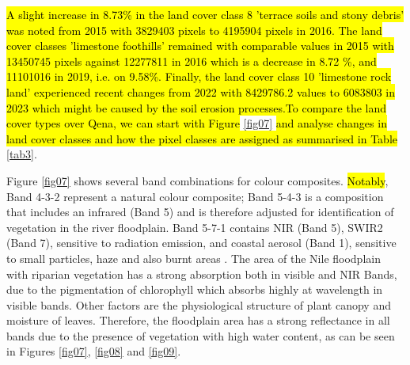 \documentclass[information,article,submit,pdftex,moreauthors]{Definitions/mdpi}
\begin{document}
\hl{A slight increase in 8.73\% in the land cover class 8 'terrace soils and stony debris' was noted from 2015 with 3829403 pixels to 4195904 pixels in 2016. The land cover classes 'limestone foothills' remained with comparable values in 2015 with 13450745 pixels against 12277811 in 2016 which is a decrease in 8.72 \%, and 11101016 in 2019, i.e. on 9.58\%. Finally, the land cover class 10 'limestone rock land' experienced recent changes from 2022 with 8429786.2 values to 6083803 in 2023 which might be caused by the soil erosion processes.}\hl{To compare the land cover types over Qena, we can start with Figure} \ref{fig07} \hl{and analyse changes in land cover classes and how the pixel classes are assigned as summarised in Table} \ref{tab3}. 

Figure \ref{fig07} shows several band combinations for colour composites. \hl{Notably}, Band 4-3-2 represent a natural colour composite; Band 5-4-3 is a composition that includes an infrared (Band 5) and is therefore adjusted for identification of vegetation in the river floodplain. Band 5-7-1 contains NIR (Band 5), SWIR2 (Band 7), sensitive to radiation emission, and coastal aerosol (Band 1), sensitive to small particles, haze and also burnt areas \cite{8611806}. The area of the Nile floodplain with riparian vegetation has a strong absorption both in visible and NIR Bands, due to the pigmentation of chlorophyll which absorbs highly at wavelength in visible bands. Other factors are the physiological structure of plant canopy and moisture of leaves. Therefore, the floodplain area has a strong reflectance in all bands due to the presence of vegetation with high water content, as can be seen in Figures \ref{fig07}, \ref{fig08} and \ref{fig09}.
\end{document}
